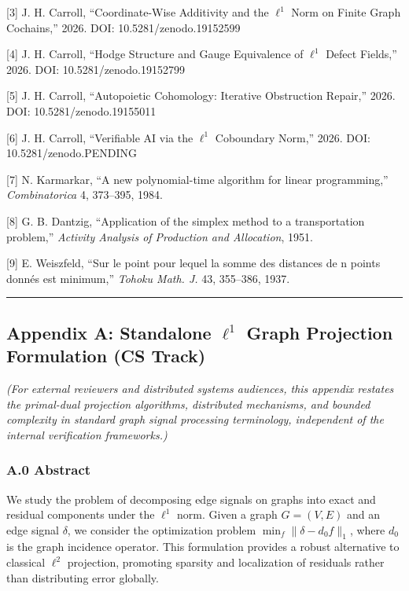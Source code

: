 \documentclass[
]{article}
\begin{document}
{[}3{]} J. H. Carroll, ``Coordinate-Wise Additivity and the \(\ell^1\)
Norm on Finite Graph Cochains,'' 2026. DOI: 10.5281/zenodo.19152599

{[}4{]} J. H. Carroll, ``Hodge Structure and Gauge Equivalence of
\(\ell^1\) Defect Fields,'' 2026. DOI: 10.5281/zenodo.19152799

{[}5{]} J. H. Carroll, ``Autopoietic Cohomology: Iterative Obstruction
Repair,'' 2026. DOI: 10.5281/zenodo.19155011

{[}6{]} J. H. Carroll, ``Verifiable AI via the \(\ell^1\) Coboundary
Norm,'' 2026. DOI: 10.5281/zenodo.PENDING

{[}7{]} N. Karmarkar, ``A new polynomial-time algorithm for linear
programming,'' \emph{Combinatorica} 4, 373--395, 1984.

{[}8{]} G. B. Dantzig, ``Application of the simplex method to a
transportation problem,'' \emph{Activity Analysis of Production and
Allocation}, 1951.

{[}9{]} E. Weiszfeld, ``Sur le point pour lequel la somme des distances
de n points donnés est minimum,'' \emph{Tohoku Math. J.} 43, 355--386,
1937.

\begin{center}\rule{0.5\linewidth}{0.5pt}\end{center}

\subsection{\texorpdfstring{Appendix A: Standalone \(\ell^1\) Graph
Projection Formulation (CS
Track)}{Appendix A: Standalone \textbackslash ell\^{}1 Graph Projection Formulation (CS Track)}}\label{appendix-a-standalone-ell1-graph-projection-formulation-cs-track}

\emph{(For external reviewers and distributed systems audiences, this
appendix restates the primal-dual projection algorithms, distributed
mechanisms, and bounded complexity in standard graph signal processing
terminology, independent of the internal verification frameworks.)}

\subsubsection{A.0 Abstract}\label{a.0-abstract}

We study the problem of decomposing edge signals on graphs into exact
and residual components under the \(\ell^1\) norm. Given a graph
\(G = (V, E)\) and an edge signal \(\delta\), we consider the
optimization problem \(\min_f \|\delta - d_0 f\|_1\), where \(d_0\) is
the graph incidence operator. This formulation provides a robust
alternative to classical \(\ell^2\) projection, promoting sparsity and
localization of residuals rather than distributing error globally.
\end{document}
